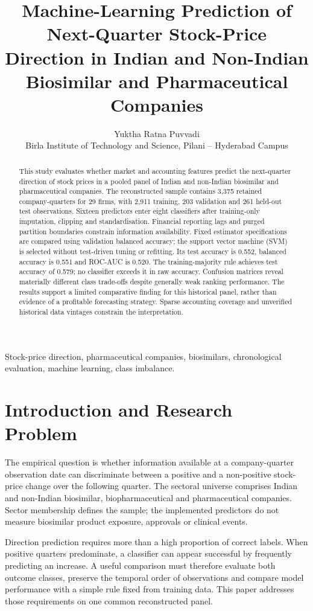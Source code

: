\documentclass[letterpaper,10pt,conference]{ieeeconf}
\title{\LARGE\bf Machine-Learning Prediction of Next-Quarter Stock-Price Direction in Indian and Non-Indian Biosimilar and Pharmaceutical Companies}
\author{Yuktha Ratna Puvvadi\\
{\small Birla Institute of Technology and Science, Pilani -- Hyderabad Campus}}
\begin{document}
\maketitle
\thispagestyle{plain}\pagestyle{plain}

\begin{abstract}
This study evaluates whether market and accounting features predict the next-quarter direction of stock prices in a pooled panel of Indian and non-Indian biosimilar and pharmaceutical companies. The reconstructed sample contains 3,375 retained company-quarters for 29 firms, with 2,911 training, 203 validation and 261 held-out test observations. Sixteen predictors enter eight classifiers after training-only imputation, clipping and standardisation. Financial reporting lags and purged partition boundaries constrain information availability. Fixed estimator specifications are compared using validation balanced accuracy; the support vector machine (SVM) is selected without test-driven tuning or refitting. Its test accuracy is 0.552, balanced accuracy is 0.551 and ROC-AUC is 0.520. The training-majority rule achieves test accuracy of 0.579; no classifier exceeds it in raw accuracy. Confusion matrices reveal materially different class trade-offs despite generally weak ranking performance. The results support a limited comparative finding for this historical panel, rather than evidence of a profitable forecasting strategy. Sparse accounting coverage and unverified historical data vintages constrain the interpretation.
\end{abstract}
\begin{keywords}
Stock-price direction, pharmaceutical companies, biosimilars, chronological evaluation, machine learning, class imbalance.
\end{keywords}

\section{Introduction and Research Problem}
The empirical question is whether information available at a company-quarter observation date can discriminate between a positive and a non-positive stock-price change over the following quarter. The sectoral universe comprises Indian and non-Indian biosimilar, biopharmaceutical and pharmaceutical companies. Sector membership defines the sample; the implemented predictors do not measure biosimilar product exposure, approvals or clinical events.

Direction prediction requires more than a high proportion of correct labels. When positive quarters predominate, a classifier can appear successful by frequently predicting an increase. A useful comparison must therefore evaluate both outcome classes, preserve the temporal order of observations and compare model performance with a simple rule fixed from training data. This paper addresses those requirements on one common reconstructed panel.
\end{document}
